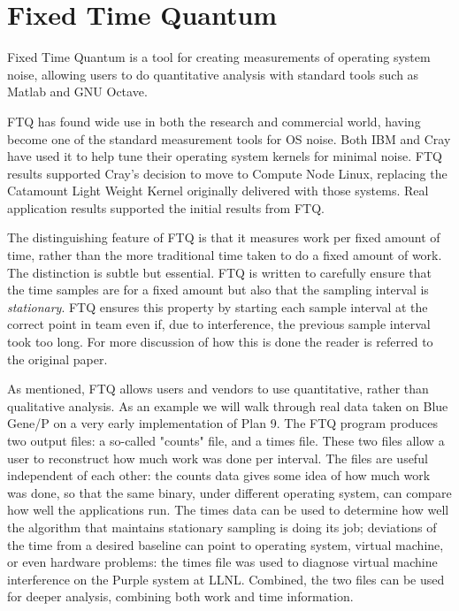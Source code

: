 \chapter{Fixed Time Quantum}

Fixed Time Quantum\cite{ftq} is a tool for creating measurements of operating system noise, allowing users to do quantitative analysis 
with
standard tools such as Matlab and GNU Octave.

FTQ has found wide use in both the research and commercial world, having become one of the standard measurement tools for OS noise. 
Both IBM and Cray have used it to help tune their operating system kernels for minimal noise. 
FTQ results supported Cray's decision to move to Compute Node Linux, replacing the Catamount Light Weight Kernel originally delivered with those systems. Real 
application results supported the initial results from FTQ. 

The distinguishing feature of FTQ is that it measures work per fixed amount of time, rather than the more traditional time taken to do a fixed amount of work. The distinction is subtle but essential.  FTQ is written to carefully ensure that the time samples are for a fixed amount but also that the sampling interval is {\em stationary}. FTQ ensures this property by starting each sample interval at the correct point in team even if, due to interference, the previous sample interval took too long. For more discussion of how this is done the reader is referred to the original paper. 

As mentioned, FTQ allows users and vendors to use quantitative, rather than qualitative analysis.  As an example we will walk through real data taken on 
Blue Gene/P on a very early implementation of Plan 9. 
The FTQ program produces two output files: a so-called "counts" file, and a times file. These two files allow a user to reconstruct how much work was done per interval. The files 
are useful independent of each other: the counts data gives some idea of how much work was done, so
that the same binary, under different operating system, can compare how well the applications run.
The times data can be used to determine how well the algorithm that maintains stationary sampling is
doing its job; deviations of the time from a desired baseline can point to operating system, virtual
machine,  or even hardware problems: the times file was used to diagnose virtual machine interference on the Purple system at LLNL. Combined, the two files can be used for deeper analysis, combining both work and time information. 

